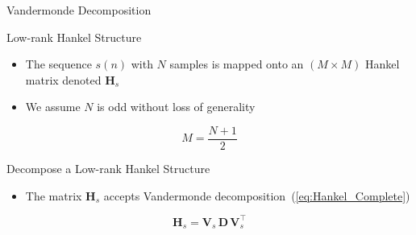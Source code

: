 \documentclass{beamer}
\begin{document}
	\begin{frame}{Vandermonde Decomposition}

		\begin{block}{Low-rank Hankel Structure}
			\begin{itemize}
				\item The sequence $s(n)$ with $N$ samples is mapped onto an $ (M\times M) $ Hankel matrix denoted ${\mathbf{H}}_s$
		    \end{itemize}
		\end{block}
	    
		\begin{itemize}
		    \item We assume $N$ is odd without loss of generality
		\end{itemize}
		
		\begin{equation}
		    M = \frac{N+1}{2}
		\end{equation}
	    
	    \begin{block}{Decompose a Low-rank Hankel Structure}
        	\begin{itemize}
        		\item The matrix ${\mathbf{H}}_s$ accepts Vandermonde decomposition~(\ref{eq:Hankel_Complete})
            \end{itemize}
        \end{block}
      \vspace{-10pt}
        \begin{equation}
            {\mathbf{H}}_s = {\mathbf{V}}_s \, {\mathbf{D}} \, {\mathbf{V}}_s^\intercal \label{eq:Hankel_Complete} 
        \end{equation}
	
	\end{frame}
\end{document}
